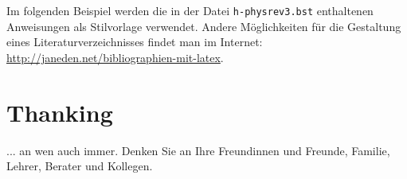 \documentclass[a4paper,11pt,oneside,final,english,toc=bib]{scrbook}
\begin{document}
Im folgenden Beispiel werden die in der Datei \texttt{h-physrev3.bst} 
enthaltenen Anweisungen als Stilvorlage verwendet. Andere 
Möglichkeiten für die Gestaltung eines Literaturverzeichnisses 
findet man im Internet: \url{http://janeden.net/bibliographien-mit-latex}.

\printbibliography

% 







\chapter{Thanking}

... an wen auch immer. Denken Sie an Ihre Freundinnen und Freunde, 
Familie, Lehrer, Berater und Kollegen.
\end{document}
